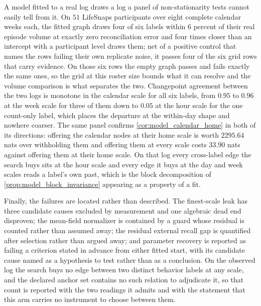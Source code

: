 A model fitted to a real log draws a log a panel of non-stationarity tests
cannot easily tell from it. On $51$ LifeSnaps participants over eight complete
calendar weeks each, the fitted graph draws four of six labels within $6$
percent of their real episode volume at exactly zero reconciliation error and
four times closer than an intercept with a participant level draws them; net of
a positive control that names the rows failing their own replicate noise, it
passes four of the six grid rows that carry evidence. On those six rows the
empty graph passes and fails exactly the same ones, so the grid at this roster
size bounds what it can resolve and the volume comparison is what separates the
two. Changepoint agreement between the two
logs is monotone in the calendar scale for all six labels, from $0.95$ to
$0.96$ at the week scale for three of them down to $0.05$ at the hour scale for
the one count-only label, which places the departure at the within-day shape
and nowhere coarser. The same panel confirms
\cref{cor:model_calendar_home} in both of its directions: offering the calendar
nodes at their home scale is worth $2295.64$ nats over withholding them and
offering them at every scale costs $33.90$ nats against offering them at their
home scale. On that log every cross-label edge the search buys sits at the hour
scale and every edge it buys at the day and week scales reads a label's own
past, which is the block decomposition of
\cref{prop:model_block_invariance} appearing as a property of a fit.

Finally, the failures are located rather than described. The finest-scale leak
has three candidate causes excluded by measurement and one algebraic dead end
disproven; the mean-field normalizer is contained by a guard whose residual is
counted rather than assumed away; the residual external recall gap is
quantified after selection rather than argued away; and parameter recovery is
reported as failing a criterion stated in advance from either fitted start, with
its candidate cause named as a hypothesis to test rather than as a conclusion.
On the observed log the search buys no edge between two distinct behavior
labels at any scale, and the declared anchor set contains no such relation to
adjudicate it, so that count is reported with the two readings it admits and
with the statement that this arm carries no instrument to choose between them.

